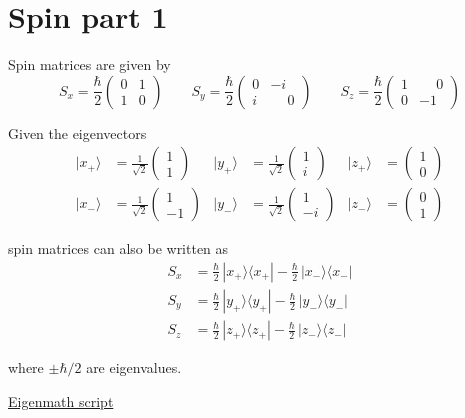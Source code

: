 

\section*{Spin part 1}

Spin matrices are given by
\begin{equation*}
S_x=\frac{\hbar}{2}\begin{pmatrix}0&1\\1&0\end{pmatrix}
\qquad
S_y=\frac{\hbar}{2}\begin{pmatrix}0&-i\\i&\phantom{-}0\end{pmatrix}
\qquad
S_z=\frac{\hbar}{2}\begin{pmatrix}1&\phantom{-}0\\0&-1\end{pmatrix}
\end{equation*}

Given the eigenvectors
\begin{align*}
|x_+\rangle&=\frac{1}{\sqrt2}\begin{pmatrix}1\\1\end{pmatrix}
&
|y_+\rangle&=\frac{1}{\sqrt2}\begin{pmatrix}1\\i\end{pmatrix}
&
|z_+\rangle&=\begin{pmatrix}1\\0\end{pmatrix}
\\[1ex]
|x_-\rangle&=\frac{1}{\sqrt2}\begin{pmatrix}1\\-1\end{pmatrix}
&
|y_-\rangle&=\frac{1}{\sqrt2}\begin{pmatrix}1\\-i\end{pmatrix}
&
|z_-\rangle&=\begin{pmatrix}0\\1\end{pmatrix}
\end{align*}

spin matrices can also be written as
\begin{align*}
S_x&=\frac{\hbar}{2}\,|x_+\rangle\langle x_+| - \frac{\hbar}{2}\,|x_-\rangle\langle x_-|
\\[1ex]
S_y&=\frac{\hbar}{2}\,|y_+\rangle\langle y_+| - \frac{\hbar}{2}\,|y_-\rangle\langle y_-|
\\[1ex]
S_z&=\frac{\hbar}{2}\,|z_+\rangle\langle z_+| - \frac{\hbar}{2}\,|z_-\rangle\langle z_-|
\end{align*}

where $\pm\hbar/2$ are eigenvalues.

\bigskip
\href{https://georgeweigt.github.io/examples/spin-part-1-demo.html}{Eigenmath script}


